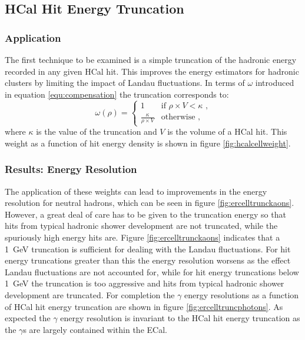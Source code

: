 
\subsection{HCal Hit Energy Truncation}
\label{sec:hcalcelltruncation}
\subsubsection{Application}
The first technique to be examined is a simple truncation of the hadronic energy recorded in any given HCal hit.  This improves the energy estimators for hadronic clusters by limiting the impact of Landau fluctuations.  In terms of $\omega$ introduced in equation \ref{equ:compensation} the truncation corresponds to:
%
\begin{equation}
\omega(\rho) =
\begin{cases}
1 & \text{if } \rho \times V < \kappa \text{ ,} \\
\frac{\kappa}{\rho \times V} & \text{otherwise} \text{ ,}
\end{cases}
\end{equation}
%
\noindent where $\kappa$ is the value of the truncation and $V$ is the volume of a HCal hit.  This weight as a function of hit energy density is shown in figure \ref{fig:hcalcellweight}.  


\subsubsection{Results: Energy Resolution}

The application of these weights can lead to improvements in the energy resolution for neutral hadrons, which can be seen in figure \ref{fig:ercelltrunckaons}.  However, a great deal of care has to be given to the truncation energy so that hits from typical hadronic shower development are not truncated, while the spuriously high energy hits are.  Figure \ref{fig:ercelltrunckaons} indicates that a 1~GeV truncation is sufficient for dealing with the Landau fluctuations.  For hit energy truncations greater than this the energy resolution worsens as the effect Landau fluctuations are not accounted for, while for hit energy truncations below 1~GeV the truncation is too aggressive and hits from typical hadronic shower development are truncated.  For completion the $\gamma$ energy resolutions as a function of HCal hit energy truncation are shown in figure \ref{fig:ercelltruncphotons}.  As expected the $\gamma$ energy resolution is invariant to the HCal hit energy truncation as the $\gamma$s are largely contained within the ECal.

